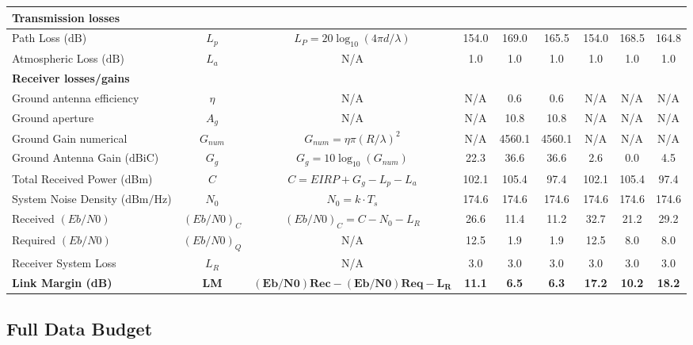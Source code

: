 \documentclass[a4paper, 11pt, conference]{IEEEtran}
\begin{document}
\begin{table}[H]
\begin{sideways}
\begin{tabular}{|l|c|c||c|c|c|c|c|c|}
\multicolumn{9}{|l|}{\textbf{Transmission losses}} \\
\hline
Path Loss ($\mathrm{dB}$) & $L_p$ & $L_P =20\log_{10}(4\pi d/\lambda)$ & 154.0 & 169.0 & 165.5 & 154.0 & 168.5 & 164.8  \\
Atmospheric Loss ($\mathrm{dB}$) & $L_a$ & N/A & 1.0 & 1.0 & 1.0 & 1.0 & 1.0 & 1.0 \\
\hline
\hline

\multicolumn{9}{|l|}{\textbf{Receiver losses/gains}} \\
\hline
Ground antenna efficiency & $\eta$ & N/A & N/A & 0.6 & 0.6 & N/A & N/A & N/A \\
Ground aperture & $A_g$ & N/A & N/A & 10.8 & 10.8 & N/A & N/A & N/A  \\
Ground Gain numerical & $G_{num}$ & $G_{num} = \eta \pi (R/\lambda)^2$ & N/A & 4560.1 & 4560.1 & N/A & N/A & N/A  \\
Ground Antenna Gain ($\mathrm{dBiC}$) & $G_g$ & $G_g = 10\log_{10}(G_{num})$ & 22.3 & 36.6 & 36.6 & 2.6 & 0.0 & 4.5  \\
Total Received Power (dBm) & $C$ & $C = EIRP+G_g-L_p-L_a$ & 102.1 & 105.4 & 97.4 & 102.1 & 105.4 & 97.4  \\
System Noise Density ($\mathrm{dBm/Hz}$) & $N_0$ & $N_0 = k \cdot T_s$ & 174.6 & 174.6 & 174.6 & 174.6 & 174.6 & 174.6 \\
Received $(Eb/N0)$ & $(Eb/N0)_{C}$ & $(Eb/N0)_{C} = C- N_0 - L_R$ & 26.6 & 11.4 & 11.2 & 32.7 & 21.2 & 29.2 \\
Required $(Eb/N0)$ & $(Eb/N0)_{Q}$ & N/A & 12.5 & 1.9 & 1.9 & 12.5 & 8.0 & 8.0  \\
Receiver System Loss & $L_R$ & N/A & 3.0 & 3.0 & 3.0 & 3.0 & 3.0 & 3.0 \\
\hline
\textbf{Link Margin (dB)} & \textbf{LM} &  $\mathbf{(Eb/N0)Rec - (Eb/N0)Req - L_R}$ & \textbf{11.1} & \textbf{6.5} & \textbf{6.3} & \textbf{17.2} & \textbf{10.2} & \textbf{18.2} \\
\hline
\end{tabular}
\end{sideways}
\end{table}

\FloatBarrier

\clearpage


\clearpage
\subsection{Full Data Budget}
\label{sub:FULL_DATA_BUDGET}
\end{document}
